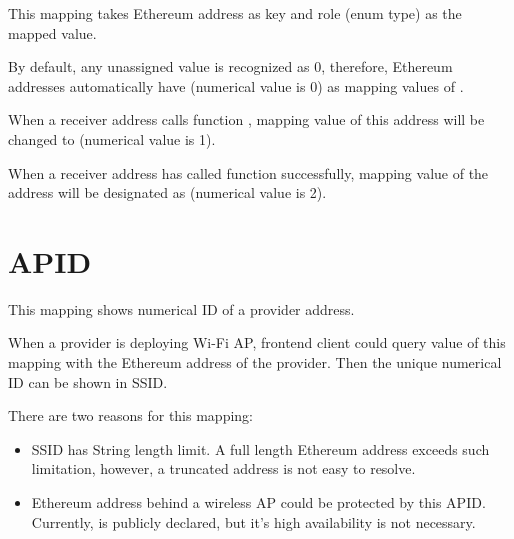 \documentclass[letterpaper,10pt,english]{sphinxmanual}
\begin{document}
This mapping takes Ethereum address as key and role (enum type) as the mapped value.

By default, any unassigned value is recognized as 0, therefore,
Ethereum addresses automatically have  (numerical value is 0) as mapping values of {\hyperref[\detokenize{index:identification}]{}}.

When a receiver address calls function {\hyperref[\detokenize{index:surprovider}]{}},
 mapping value of this address will be changed to  (numerical value is 1).

When a receiver address has called function {\hyperref[\detokenize{index:link}]{}} successfully,
mapping value of the address will be designated as  (numerical value is 2).


\section{APID}
\label{\detokenize{index:apid}}
%
\begin{sphinxVerbatim}[commandchars=\\\{\}]
     
\end{sphinxVerbatim}

This mapping shows numerical ID of a provider address.

When a provider is deploying Wi-Fi AP, frontend client could
query value of this mapping with the Ethereum address
of the provider. Then the unique numerical ID can be shown in SSID.

There are two reasons for this mapping:
\begin{itemize}
\item {} 
SSID has String length limit. A full length Ethereum address exceeds such limitation, however, a truncated address is not easy to resolve.

\item {} 
Ethereum address behind a wireless AP could be protected by this APID. Currently, {\hyperref[\detokenize{index:providerbehind}]{}} is publicly declared, but it’s high availability is not necessary.

\end{itemize}
\end{document}
